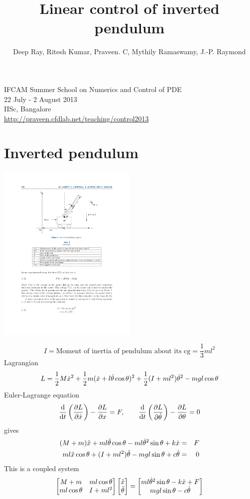 \documentclass[12pt]{article}
\title{Linear control of inverted pendulum}
\author{Deep Ray, Ritesh Kumar, Praveen. C, Mythily Ramaswamy, J.-P. Raymond}
\date{}
\begin{document}
\maketitle

\begin{center}
IFCAM Summer School on Numerics and Control of PDE\\
22 July - 2 August 2013\\
IISc, Bangalore\\
\url{http://praveen.cfdlab.net/teaching/control2013}
\end{center}

\section{Inverted pendulum}
\begin{center}
\includegraphics[width=0.50\textwidth]{inv_pendulum}
\end{center}
\[
I = \mbox{Moment of inertia of pendulum about its cg} = \frac{1}{3} m l^2
\]
Lagrangian
\[
L = \frac{1}{2} M \dot{x}^2 + \frac{1}{2}m(\dot{x} + l \dot{\theta} \cos\theta)^2 + \frac{1}{2}(I+ml^2)     \dot{\theta}^2 - mgl\cos\theta
\]
Euler-Lagrange equation
\[
\frac{\textrm{d} }{\textrm{d} t} \left(\frac{\partial L}{\partial \dot{x}}\right) - \frac{\partial L}{\partial x} = F, \qquad \frac{\textrm{d} }{\textrm{d} t} \left( \frac{\partial L}{\partial \dot{\theta}}      \right) - \frac{\partial L}{\partial \theta} = 0
\]
gives
\begin{eqnarray*}
(M+m) \ddot{x} + m l \ddot{\theta} \cos\theta - m l \dot{\theta}^2 \sin\theta + k \dot{x} &=&  F \\
m l \ddot{x} \cos\theta + (I+ml^2) \ddot{\theta} - mg l \sin\theta + c \dot{\theta} &=& 0
\end{eqnarray*}
This is a coupled system
\[
\begin{bmatrix}
M+m & m l \cos\theta \\
m l \cos\theta & I + ml^2 \end{bmatrix}
\begin{bmatrix}
\ddot{x} \\ \ddot{\theta} \end{bmatrix} = \begin{bmatrix}
m l \dot{\theta}^2 \sin\theta - k \dot{x} + F \\
mg l \sin\theta - c \dot{\theta} \end{bmatrix}
\]
\end{document}
